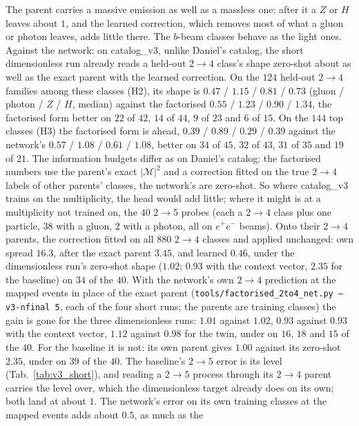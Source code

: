 \documentclass[11pt]{article}
\newcommand{\code}[1]{\texttt{#1}}
\begin{document}
The parent carries a massive emission as well as a massless one: after it a $Z$ or $H$ leaves about $1$, and the learned
correction, which removes most of what a gluon or photon leaves, adds little there. The $b$-beam classes behave as
the light ones. Against the network: on catalog\_v3, unlike Daniel's catalog, the short dimensionless run already
reads a held-out $2\to4$ class's shape zero-shot about as well as the exact parent with the learned correction. On the
$124$ held-out $2\to4$ families among these classes (H2), its shape is $0.47$ / $1.15$ / $0.81$ / $0.73$ (gluon /
photon / $Z$ / $H$, median) against the factorised $0.55$ / $1.23$ / $0.90$ / $1.34$, the factorised form better on
$22$ of $42$, $14$ of $44$, $9$ of $23$ and $6$ of $15$. On the $144$ top classes (H3) the factorised form is ahead,
$0.39$ / $0.89$ / $0.29$ / $0.39$ against the network's $0.57$ / $1.08$ / $0.61$ / $1.08$, better on $34$ of $45$,
$32$ of $43$, $31$ of $35$ and $19$ of $21$. The information budgets differ as on Daniel's catalog: the factorised
numbers use the parent's exact $|\mathcal M|^2$ and a correction fitted on the true $2\to4$ labels of other parents'
classes, the network's are zero-shot. So where catalog\_v3 trains on the multiplicity, the head would add little; where
it might is at a multiplicity not trained on, the $40$ $2\to5$ probes (each a $2\to4$ class plus one particle, $38$
with a gluon, $2$ with a photon, all on $e^+e^-$ beams). Onto their $2\to4$ parents, the correction fitted on all $880$
$2\to4$ classes and applied unchanged: own spread $16.3$, after the exact parent $3.45$, and learned $0.46$, under the
dimensionless run's zero-shot shape ($1.02$; $0.93$ with the context vector, $2.35$ for the baseline) on $34$ of the
$40$. With the network's own $2\to4$ prediction at the mapped events in place of the exact parent
(\code{tools/factorised\_2to4\_net.py --v3-nfinal 5}, each of the four short runs; the parents are training
classes) the gain is gone for the three dimensionless runs: $1.01$ against $1.02$, $0.93$ against $0.93$ with the
context vector, $1.12$ against $0.98$ for the twin, under on $16$, $18$ and $15$ of the $40$. For the baseline it is
not: its own parent gives $1.00$ against its zero-shot $2.35$, under on $39$ of the $40$. The baseline's $2\to5$ error
is its level (Tab.~\ref{tab:v3_short}), and reading a $2\to5$ process through its $2\to4$ parent carries the level
over, which the dimensionless target already does on its own; both land at about $1$. The network's error on its own training classes at the mapped events adds about $0.5$, as much as the
\end{document}
